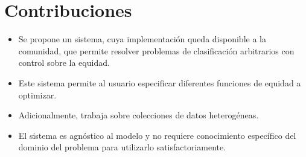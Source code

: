 

\section*{Contribuciones}

\begin{itemize}
    \item Se propone un sistema, cuya implementación queda disponible a la comunidad, que permite resolver problemas de clasificación arbitrarios con control sobre la equidad.
    \item Este sistema permite al usuario especificar diferentes funciones de equidad a optimizar.
    \item Adicionalmente, trabaja sobre colecciones de datos heterogéneas.
    \item El sistema es agnóstico al modelo y no requiere conocimiento específico del dominio del problema para utilizarlo satisfactoriamente.
\end{itemize}

